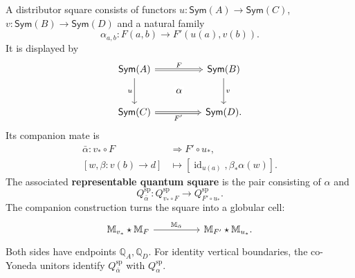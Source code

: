 \documentclass[oneside]{article}
\newcommand{\Sym}{\mathsf{Sym}}
\newcommand{\id}{\operatorname{id}}
\theoremstyle{plain}
\theoremstyle{definition}
\theoremstyle{remark}
\begin{document}
A distributor square consists of functors \(u:\Sym(A)\to \Sym(C)\),
\(v:\Sym(B)\to \Sym(D)\) and a natural family
\begin{equation}
 \alpha_{a,b}:F(a,b)\longrightarrow F'(u(a),v(b)).
 \label{eq:cgqg-distributor-square}
\end{equation}
It is displayed by
\[
 \begin{tikzcd}[column sep=huge,row sep=large]
 \Sym(A)\arrow[r,Rightarrow,"F"]\arrow[d,"u"']
   &\Sym(B)\arrow[d,"v"]\\
 \Sym(C)\arrow[r,Rightarrow,"F'"']&\Sym(D)
 \arrow[phantom,from=1-1,to=2-2,"\alpha" description].
 \end{tikzcd}
\]
Its companion mate is
\begin{equation}
 \begin{split}
 \bar\alpha:v_*\circ F&\Longrightarrow F'\circ u_*,\\
 [w,\beta:v(b)\to d]&\longmapsto
       [\id_{u(a)},\beta_*\alpha(w)].
 \end{split}
 \label{eq:cgqg-distributor-square-mate-formula}
\end{equation}
The associated \textbf{representable quantum square} is the pair
consisting of \(\alpha\) and
\begin{equation}
 Q_{\bar\alpha}^{\mathrm{sp}}:
 Q_{v_*\circ F}^{\mathrm{sp}}
       \longrightarrow Q_{F'\circ u_*}^{\mathrm{sp}}.
 \label{eq:cgqg-representable-quantum-square}
\end{equation}
The companion construction turns the square into a globular cell:
\[
 \begin{tikzcd}[column sep=huge,row sep=large]
 \mathbb M_{v_*}\star\mathbb M_F
   \arrow[r,"\mathbb M_{\bar\alpha}"]
   &\mathbb M_{F'}\star\mathbb M_{u_*}.
 \end{tikzcd}
\]
Both sides have endpoints \(\mathbb Q_A,\mathbb Q_D\).
For identity vertical boundaries, the co-Yoneda unitors identify
\(Q_{\bar\alpha}^{\mathrm{sp}}\) with \(Q_\alpha^{\mathrm{sp}}\).
\end{document}

